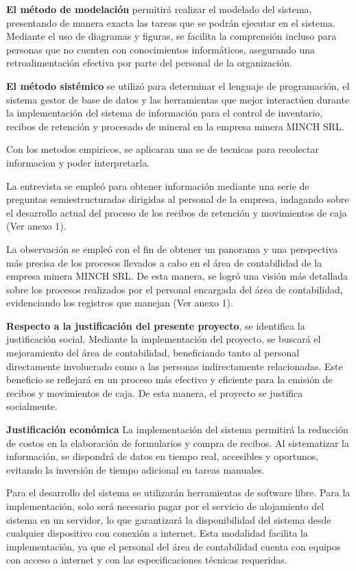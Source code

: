 \documentclass[stu]{apa7}
\begin{document}
\textbf{El método de modelación} permitirá realizar el modelado del sistema, presentando de manera exacta las tareas que se podrán ejecutar en el sistema. Mediante el uso de diagramas y figuras, se facilita la comprensión incluso para personas que no cuenten con conocimientos informáticos, asegurando una retroalimentación efectiva por parte del personal de la organización.

\textbf{El método sistémico} se utilizó para determinar el lenguaje de programación, el sistema gestor de base de datos y las herramientas que mejor interactúen durante la implementación del sistema de información para el control de inventario, recibos de retención y procesado de mineral en la empresa minera MINCH SRL.

Con los metodos empiricos, se aplicaran una se de tecnicas para recolectar informacion y poder interpretarla.

La entrevista se empleó para obtener información mediante una serie de preguntas semiestructuradas dirigidas al personal de la empresa, indagando sobre el desarrollo actual del proceso de los recibos de retención y movimientos de caja (Ver anexo 1).

La observación se empleó con el fin de obtener un panorama y una perspectiva más precisa de los procesos llevados a cabo en el área de contabilidad de la empresa minera MINCH SRL. De esta manera, se logró una visión más detallada sobre los procesos realizados por el personal encargada del área de contabilidad, evidenciando los registros que manejan (Ver anexo 1).

\textbf{Respecto a la justificación del presente proyecto}, se identifica la justificación social. Mediante la implementación del proyecto, se buscará el mejoramiento del área de contabilidad, beneficiando tanto al personal directamente involucrado como a las personas indirectamente relacionadas. Este beneficio se reflejará en un proceso más efectivo y eficiente para la emisión de recibos y movimientos de caja. De esta manera, el proyecto se justifica socialmente.

\textbf{Justificación económica} La implementación del sistema permitirá la reducción de costos en la elaboración de formularios y compra de recibos. Al sistematizar la información, se dispondrá de datos en tiempo real, accesibles y oportunos, evitando la inversión de tiempo adicional en tareas manuales.

Para el desarrollo del sistema se utilizarán herramientas de software libre. Para la implementación, solo será necesario pagar por el servicio de alojamiento del sistema en un servidor, lo que garantizará la disponibilidad del sistema desde cualquier dispositivo con conexión a internet. Esta modalidad facilita la implementación, ya que el personal del área de contabilidad cuenta con equipos con acceso a internet y con las especificaciones técnicas requeridas.
\end{document}
